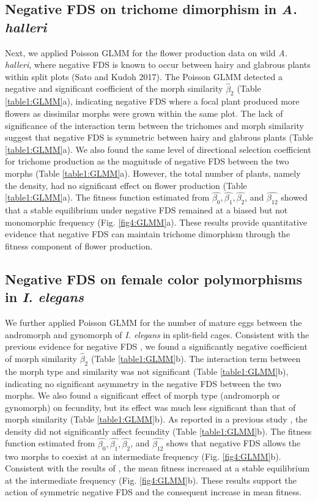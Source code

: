 \documentclass[12pt,]{article}
\begin{document}
\subsection{Negative FDS on trichome dimorphism in \textit{A. halleri}}
Next, we applied Poisson GLMM for the flower production data on wild \textit{A. halleri}, where negative FDS is known to occur between hairy and glabrous plants within split plots (Sato and Kudoh 2017). The Poisson GLMM detected a negative and significant coefficient of the morph similarity $\hat{\beta}_2$ (Table \ref{table1:GLMM}a), indicating negative FDS where a focal plant produced more flowers as dissimilar morphs were grown within the same plot. The lack of significance of the interaction term between the trichomes and morph similarity suggest that negative FDS is symmetric between hairy and glabrous plants (Table \ref{table1:GLMM}a). We also found the same level of directional selection coefficient for trichome production as the magnitude of negative FDS between the two morphs (Table \ref{table1:GLMM}a). However, the total number of plants, namely the density, had no significant effect on flower production (Table \ref{table1:GLMM}a). The fitness function estimated from $\hat{\beta_0}, \hat{\beta_1}, \hat{\beta_2}$, and $\hat{\beta_{12}}$ showed that a stable equilibrium under negative FDS remained at a biased but not monomorphic frequency (Fig. \ref{fig4:GLMM}a). These results provide quantitative evidence that negative FDS can maintain trichome dimorphism through the fitness component of flower production. 

\subsection{Negative FDS on female color polymorphisms in \textit{I. elegans}}
We further applied Poisson GLMM for the number of mature eggs between the andromorph and gynomorph of \textit{I. elegans} in split-field cages. Consistent with the previous evidence for negative FDS \citep{van2001frequency, le2015evolutionary}, we found a significantly negative coefficient of morph similarity $\hat{\beta}_2$ (Table \ref{table1:GLMM}b). The interaction term between the morph type and similarity was not significant (Table \ref{table1:GLMM}b), indicating no significant asymmetry in the negative FDS between the two morphs. We also found a significant effect of morph type (andromorph or gynomorph) on fecundity, but its effect was much less significant than that of morph similarity (Table \ref{table1:GLMM}b). As reported in a previous study \citep{takahashi2014evolution}, the density did not significantly affect fecundity (Table \ref{table1:GLMM}b). The fitness function estimated from $\hat{\beta_0}, \hat{\beta_1}, \hat{\beta_2}$, and $\hat{\beta_{12}}$ shows that negative FDS allows the two morphs to coexist at an intermediate frequency (Fig. \ref{fig4:GLMM}b). Consistent with the results of \cite{takahashi2014evolution}, the mean fitness increased at a stable equilibrium at the intermediate frequency (Fig. \ref{fig4:GLMM}b). These results support the action of symmetric negative FDS and the consequent increase in mean fitness.
\end{document}
